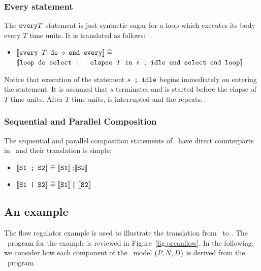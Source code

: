 \subsubsection{Every statement}
The $\mbox{\tt every} T$ statement is just syntactic sugar for a loop which
executes its body every $T$ time units. It is translated as follows:
\begin{itemize}
\item $\sbl \trm{every } T \trm{ do } s \trm{ end every} \sbr \defs$ \\ 
  \hspace*{1em}
  $\sbl \trm{loop do select :: elapse } T \trm{ in } s 
        \trm{ ; idle end select end loop} \sbr$
\end{itemize}
Notice that execution of the statement $s\trm{ ; idle}$ begins immediately
on entering the  statement. It is assumed that $s$ terminates
and  is started before the elapse of $T$ time units. After
$T$ time units,  is interrupted and the  repeats.

\subsubsection{Sequential and Parallel Composition}
The sequential and parallel composition statements of \candle\ have direct
counterparts in \bcandle\ and their translation is simple:
\begin{itemize}
\item ${\lbrack\!\lbrack} \mbox{\tt S1 ; S2} {\rbrack\!\rbrack} \mathrel{\widehat=} 
        {\lbrack\!\lbrack} \mbox{\tt S1} {\rbrack\!\rbrack} \mathbin{\mathrm{;}\!} {\lbrack\!\lbrack} \mbox{\tt S2} {\rbrack\!\rbrack}$ 
\item $\sbl \trm{S1 | S2} \sbr \defs 
        \sbl \trm{S1} \sbr \parallel \sbl \trm{S2} \sbr$ 
\end{itemize}

\subsection{An example}\label{ss:prcantransexample}
The flow regulator example is used to illustrate the translation from
\candle\ to \bcandle. The \candle\ program for the example is reviewed
in Figure~\ref{fig:prcanflow}. In the following, we consider how each
component of the \bcandle\ model $({P},{N},{D})$ is derived from the
\candle\ program.

